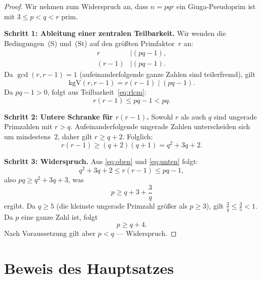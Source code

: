 \documentclass[12pt,a4paper]{amsart}
\theoremstyle{definition}
\begin{document}
\begin{proof}
Wir nehmen zum Widerspruch an, dass $n = pqr$ ein Giuga-Pseudoprim ist
mit $3 \le p < q < r$ prim.

\medskip
\noindent\textbf{Schritt 1: Ableitung einer zentralen Teilbarkeit.}
Wir wenden die Bedingungen~(S) und~(St) auf den größten Primfaktor~$r$ an:
\begin{align}
  r &\mid (pq - 1), \label{eq:rS} \\
  (r - 1) &\mid (pq - 1). \label{eq:rSt}
\end{align}
Da $\gcd(r, r-1) = 1$ (aufeinanderfolgende ganze Zahlen sind teilerfremd), gilt
\begin{equation}
  \text{kgV}(r, r-1) = r(r-1) \mid (pq - 1).
  \label{eq:rlcm}
\end{equation}
Da $pq - 1 > 0$, folgt aus Teilbarkeit~\eqref{eq:rlcm}:
\begin{equation}
  r(r - 1) \le pq - 1 < pq.
  \label{eq:oben}
\end{equation}

\medskip
\noindent\textbf{Schritt 2: Untere Schranke für $r(r-1)$.}
Sowohl $r$ als auch $q$ sind ungerade Primzahlen mit $r > q$. Aufeinanderfolgende
ungerade Zahlen unterscheiden sich um mindestens~$2$, daher gilt $r \ge q + 2$.
Folglich:
\begin{equation}
  r(r - 1) \ge (q + 2)(q + 1) = q^2 + 3q + 2.
  \label{eq:unten}
\end{equation}

\medskip
\noindent\textbf{Schritt 3: Widerspruch.}
Aus \eqref{eq:oben} und \eqref{eq:unten} folgt:
\[
  q^2 + 3q + 2 \le r(r-1) \le pq - 1,
\]
also $pq \ge q^2 + 3q + 3$, was
\[
  p \ge q + 3 + \frac{3}{q}
\]
ergibt. Da $q \ge 5$ (die kleinste ungerade Primzahl größer als $p \ge 3$),
gilt $\tfrac{3}{q} \le \tfrac{3}{5} < 1$. Da $p$ eine ganze Zahl ist, folgt
\[
  p \ge q + 4.
\]
Nach Voraussetzung gilt aber $p < q$ — Widerspruch.
\end{proof}

\section{Beweis des Hauptsatzes}
\end{document}

